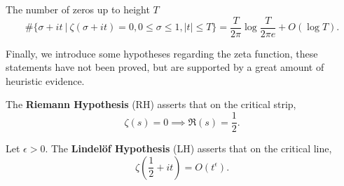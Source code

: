 \begin{theorem}
	The number of zeros up to height $T$\[
	\#\{\sigma+it \ | \ \zeta(\sigma+it)=0,0 \leq \sigma\leq 1, |t|\leq T \} = \frac{T}{2\pi}\log{\frac{T}{2\pi e}} + O(\log T).
	\]
\end{theorem}

Finally, we introduce some hypotheses regarding the zeta function, these statements have not been proved, but are supported by a great amount of heuristic evidence.
\begin{definition}
	The \textbf{Riemann Hypothesis} (RH) asserts that on the critical strip, \[
		\zeta(s) = 0 \implies \Re(s) = \frac{1}{2}. 
	\]
\end{definition}

\begin{definition}
	Let $\epsilon>0$. The \textbf{Lindel\"of Hypothesis} (LH) asserts that on the critical line, \[
		\zeta\left(\frac{1}{2}+it\right) = O(t^\epsilon).
	\]
\end{definition}